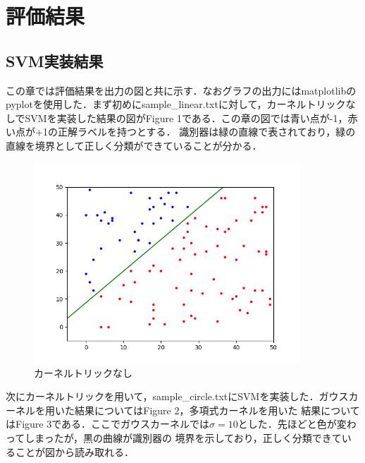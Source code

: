 \documentclass[11pt]{article}
\begin{document}
\section{評価結果}
\subsection{SVM実装結果}
この章では評価結果を出力の図と共に示す．なおグラフの出力にはmatplotlibのpyplotを使用した．まず初めにsample\_linear.txtに対して，カーネルトリックなしでSVMを実装した結果の図がFigure 1である．この章の図では青い点が-1，赤い点が+1の正解ラベルを持つとする．
識別器は緑の直線で表されており，緑の直線を境界として正しく分類ができていることが分かる．\par
\begin{figure}[htbp]
    \begin{center}
        \caption{カーネルトリックなし}
        \includegraphics[width=10cm]{../results/linear.png}
    \end{center}
\end{figure}
次にカーネルトリックを用いて，sample\_circle.txtにSVMを実装した．ガウスカーネルを用いた結果についてはFigure 2，多項式カーネルを用いた
結果についてはFigure 3である．ここでガウスカーネルでは$\sigma=10$とした．先ほどと色が変わってしまったが，黒の曲線が識別器の
境界を示しており，正しく分類できていることが図から読み取れる．\par
\end{document}

